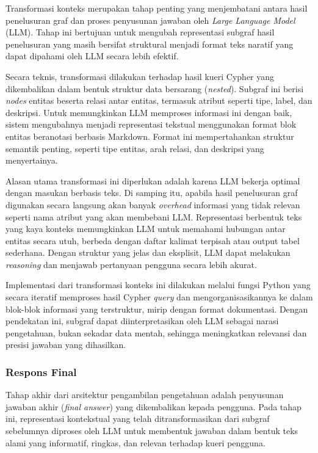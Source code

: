 Transformasi konteks merupakan tahap penting yang menjembatani antara hasil penelusuran graf dan proses penyusunan jawaban oleh \textit{Large Language Model} (LLM).
Tahap ini bertujuan untuk mengubah representasi subgraf hasil penelusuran yang masih bersifat struktural menjadi format teks naratif yang dapat dipahami oleh LLM secara lebih efektif.

Secara teknis, transformasi dilakukan terhadap hasil kueri Cypher yang dikembalikan dalam bentuk struktur data bersarang (\textit{nested}).
Subgraf ini berisi \textit{nodes} entitas beserta relasi antar entitas, termasuk atribut seperti tipe, label, dan deskripsi.
Untuk memungkinkan LLM memproses informasi ini dengan baik, sistem mengubahnya menjadi representasi tekstual menggunakan format blok entitas beranotasi berbasis Markdown.
Format ini mempertahankan struktur semantik penting, seperti tipe entitas, arah relasi, dan deskripsi yang menyertainya.

Alasan utama transformasi ini diperlukan adalah karena LLM bekerja optimal dengan masukan berbasis teks.
Di samping itu, apabila hasil penelusuran graf digunakan secara langsung akan banyak \textit{overhead} informasi yang tidak relevan seperti nama atribut yang akan membebani LLM.
Representasi berbentuk teks yang kaya konteks memungkinkan LLM untuk memahami hubungan antar entitas secara utuh, berbeda dengan daftar kalimat terpisah atau output tabel sederhana.
Dengan struktur yang jelas dan eksplisit, LLM dapat melakukan \textit{reasoning} dan menjawab pertanyaan pengguna secara lebih akurat.

Implementasi dari transformasi konteks ini dilakukan melalui fungsi Python yang secara iteratif memproses hasil Cypher \textit{query} dan mengorganisasikannya ke dalam blok-blok informasi yang terstruktur, mirip dengan format dokumentasi.
Dengan pendekatan ini, subgraf dapat diinterpretasikan oleh LLM sebagai narasi pengetahuan, bukan sekadar data mentah, sehingga meningkatkan relevansi dan presisi jawaban yang dihasilkan.

\subsubsection{Respons Final}
Tahap akhir dari arsitektur pengambilan pengetahuan adalah penyusunan jawaban akhir (\textit{final answer}) yang dikembalikan kepada pengguna.
Pada tahap ini, representasi kontekstual yang telah ditransformasikan dari subgraf sebelumnya diproses oleh LLM untuk membentuk jawaban dalam bentuk teks alami yang informatif, ringkas, dan relevan terhadap kueri pengguna.

